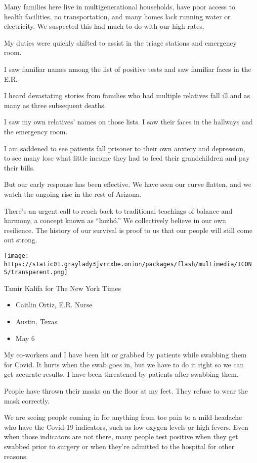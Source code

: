 Many families here live in multigenerational households, have poor
access to health facilities, no transportation, and many homes lack
running water or electricity. We suspected this had much to do with our
high rates.

My duties were quickly shifted to assist in the triage stations and
emergency room.

I saw familiar names among the list of positive tests and saw familiar
faces in the E.R.

I heard devastating stories from families who had multiple relatives
fall ill and as many as three subsequent deaths.

I saw my own relatives' names on those lists. I saw their faces in the
hallways and the emergency room.

I am saddened to see patients fall prisoner to their own anxiety and
depression, to see many lose what little income they had to feed their
grandchildren and pay their bills.

But our early response has been effective. We have seen our curve
flatten, and we watch the ongoing rise in the rest of Arizona.

There's an urgent call to reach back to traditional teachings of balance
and harmony, a concept known as ``hozhó.'' We collectively believe in
our own resilience. The history of our survival is proof to us that our
people will still come out strong.

\texttt{[image: https://static01.graylady3jvrrxbe.onion/packages/flash/multimedia/ICONS/transparent.png]}

Tamir Kalifa for The New York Times

\begin{itemize}
\tightlist
\item
  Caitlin Ortiz, E.R. Nurse
\item
  Austin, Texas
\item
  May 6
\end{itemize}

My co-workers and I have been hit or grabbed by patients while swabbing
them for Covid. It hurts when the swab goes in, but we have to do it
right so we can get accurate results. I have been threatened by patients
after swabbing them.

People have thrown their masks on the floor at my feet. They refuse to
wear the mask correctly.

We are seeing people coming in for anything from toe pain to a mild
headache who have the Covid-19 indicators, such as low oxygen levels or
high fevers. Even when those indicators are not there, many people test
positive when they get swabbed prior to surgery or when they're admitted
to the hospital for other reasons.

